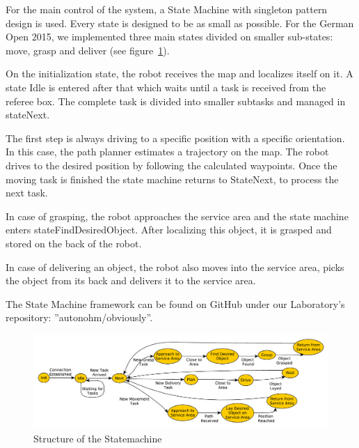 For the main control of the system, a State Machine with singleton pattern design is used. Every state is designed to be as small as possible. For the German Open 2015, we implemented three main states divided on smaller sub-states: move, grasp and deliver (see figure~\ref{fig:SM}).

On the initialization state, the robot receives the map and localizes itself on it. A state Idle is entered after that which waits until a task is received from the referee box. The complete task is divided into smaller subtasks and managed in stateNext. 

The first step is always driving to a specific position with a specific orientation. In this case, the path planner estimates a trajectory on the map. The robot drives to the desired position by following the calculated waypoints. Once the moving task is finished the state machine returns to StateNext, to process the next task.

In case of grasping, the robot approaches the service area and the state machine enters stateFindDesiredObject. After localizing this object, it is grasped and stored on the back of the robot.


In case of delivering an object, the robot also moves into the service area, picks the object from its back and delivers it to the service area.


The State Machine framework can be found on GitHub under our Laboratory’s repository: ”autonohm/obviously”.

\begin{figure}[htbp]
	\centering
	\includegraphics[width=\textwidth]{img/sm}
	\caption{Structure of the Statemachine}
	\label{fig:SM}
\end{figure}